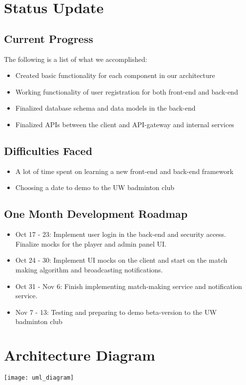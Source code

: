 \documentclass{article}
\begin{document}
\section{Status Update}

\subsection{Current Progress}
The following is a list of what we accomplished:
\begin{itemize}
  \item Created basic functionality for each component in our architecture
  \item Working functionality of user registration for both front-end and back-end
  \item Finalized database schema and data models in the back-end
  \item Finalized APIs between the client and API-gateway and internal services
\end{itemize}

\subsection{Difficulties Faced}
\begin{itemize}
  \item A lot of time spent on learning a new front-end and back-end framework
  \item Choosing a date to demo to the UW badminton club
\end{itemize}

\subsection{One Month Development Roadmap}
\begin{itemize}
  \item Oct 17 - 23: Implement user login in the back-end and security access. Finalize mocks for the player and admin panel UI.
  \item Oct 24 - 30: Implement UI mocks on the client and start on the match making algorithm and broadcasting notifications.
  \item Oct 31 - Nov 6: Finish implementing match-making service and notification service.
  \item Nov 7 - 13: Testing and preparing to demo beta-version to the UW badminton club
\end{itemize}

\newpage

\section{Architecture Diagram}
\texttt{[image: uml\_diagram]}
\end{document}
